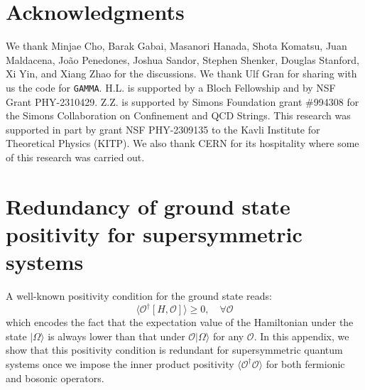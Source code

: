 \documentclass[11pt]{article}
\def\i{\mathrm{i}}
\begin{document}
\section*{Acknowledgments}



We thank Minjae Cho, Barak Gabai, Masanori Hanada, Shota Komatsu, Juan Maldacena, João Penedones, Joshua Sandor, Stephen Shenker, Douglas Stanford, Xi Yin, and Xiang Zhao for the discussions. We thank Ulf Gran for sharing with us the code for \texttt{GAMMA}. 
H.L. is supported by a Bloch Fellowship and by NSF Grant PHY-2310429. Z.Z. is supported by Simons Foundation grant \#994308 for the Simons Collaboration on Confinement and
QCD Strings.
This research was supported in part by grant NSF PHY-2309135 to the Kavli Institute for Theoretical Physics (KITP). We also thank CERN for its hospitality where some of this research was carried out.



\appendix
\def\i{\mathrm{i}}





\section{Redundancy of ground state positivity for supersymmetric systems \label{app: gpositivity}}

A well-known positivity condition for the ground state reads:
\begin{equation}\label{eq: groundpos}
    \langle \mathcal{O}^\dagger[H, \mathcal{O}]\rangle\geq0,\quad \forall \mathcal{O}
\end{equation}
which encodes the fact that the expectation value of the Hamiltonian under the state $|\Omega \rangle$ is always lower than that under $\mathcal{O} |\Omega \rangle$ for any $\mathcal{O}$.
In this appendix, we show that this positivity condition is redundant for supersymmetric quantum systems once we impose the inner product positivity $\langle \mathcal{O}^\dagger \mathcal{O} \rangle$ for both fermionic and bosonic operators.
\end{document}

